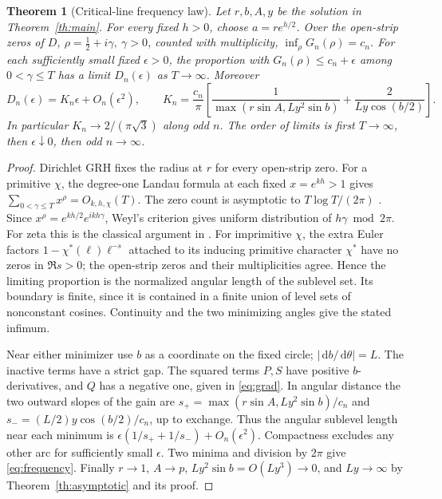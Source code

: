 \documentclass[11pt,letterpaper]{article}
\newtheorem{theorem}{Theorem}
\newcommand{\dd}{\,\mathrm d}
\begin{document}
\begin{theorem}[Critical-line frequency law]\label{th:zeta}
Let \(r,b,A,y\) be the solution in Theorem~\ref{th:main}. For every fixed
\(h>0\), choose \(a=r e^{h/2}\). Over the open-strip zeros of \(D\),
\(\rho=\tfrac12+i\gamma,\ \gamma>0\), counted with multiplicity,
\(\inf_\rho G_n(\rho)=c_n\). For each sufficiently small fixed
\(\epsilon>0\), the proportion with \(G_n(\rho)\le c_n+\epsilon\)
among \(0<\gamma\le T\) has a limit \(D_n(\epsilon)\) as \(T\to\infty\).
Moreover
\begin{equation}\label{eq:frequency}
 D_n(\epsilon)=K_n\epsilon+O_n(\epsilon^2),\qquad
 K_n=\frac{c_n}{\pi}\left[
 \frac{1}{\max(r\sin A,Ly^2\sin b)}
 +\frac{2}{Ly\cos(b/2)}\right].
\end{equation}
In particular \(K_n\to2/(\pi\sqrt3)\) along odd \(n\). The order of limits
is first \(T\to\infty\), then \(\epsilon\downarrow0\), then odd \(n\to\infty\).
\end{theorem}

\begin{proof}
Dirichlet GRH fixes the radius at \(r\) for every open-strip zero. For a
primitive \(\chi\), the degree-one Landau formula at each fixed \(x=e^{kh}>1\)
gives \(\sum_{0<\gamma\le T}x^\rho=O_{k,h,\chi}(T)\).
The zero count is asymptotic to \(T\log T/(2\pi)\)
\cite[eq.~(2.1) and Lemma 2.1]{fzl}. Since \(x^\rho=e^{kh/2}e^{ikh\gamma}\),
Weyl's criterion gives uniform distribution of \(h\gamma\bmod 2\pi\).
For zeta this is the classical argument in \cite{fz}. For imprimitive
\(\chi\), the extra Euler factors \(1-\chi^*(\ell)\ell^{-s}\) attached to
its inducing primitive character \(\chi^*\) have no zeros in \(\Re s>0\);
the open-strip zeros and their multiplicities agree. Hence the limiting
proportion is the normalized angular length of the sublevel set. Its boundary is finite, since it is contained
in a finite union of level sets of nonconstant cosines. Continuity and the
two minimizing angles give the stated infimum.

Near either minimizer use \(b\) as a coordinate on the fixed circle;
\(|\dd b/\dd\theta|=L\). The inactive terms have a strict gap. The squared
terms \(P,S\) have positive \(b\)-derivatives, and \(Q\) has a negative one,
given in \eqref{eq:grad}. In angular distance the two outward slopes of the
gain are \(s_+=\max(r\sin A,Ly^2\sin b)/c_n\) and
\(s_-=(L/2)y\cos(b/2)/c_n\), up to exchange. Thus the angular sublevel
length near each minimum is \(\epsilon(1/s_++1/s_-)+O_n(\epsilon^2)\).
Compactness excludes any other arc for sufficiently small \(\epsilon\).
Two minima and division by \(2\pi\) give \eqref{eq:frequency}. Finally
\(r\to1\), \(A\to p\), \(Ly^2\sin b=O(Ly^3)\to0\), and \(Ly\to\infty\)
by Theorem~\ref{th:asymptotic} and its proof.
\end{proof}
\end{document}
